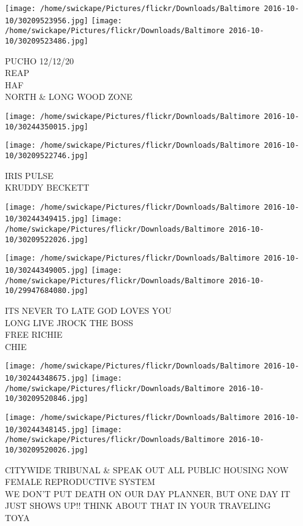 \documentclass[10pt,letterpaper]{article}
\begin{document}
\texttt{[image: /home/swickape/Pictures/flickr/Downloads/Baltimore 2016-10-10/30209523956.jpg]}
\texttt{[image: /home/swickape/Pictures/flickr/Downloads/Baltimore 2016-10-10/30209523486.jpg]}

PUCHO 12/12/20\\
REAP\\
HAF\\
NORTH \& LONG WOOD ZONE
\pagebreak

\texttt{[image: /home/swickape/Pictures/flickr/Downloads/Baltimore 2016-10-10/30244350015.jpg]}

\vspace{0.25in}
\texttt{[image: /home/swickape/Pictures/flickr/Downloads/Baltimore 2016-10-10/30209522746.jpg]}

IRIS PULSE\\
KRUDDY BECKETT
\pagebreak

\texttt{[image: /home/swickape/Pictures/flickr/Downloads/Baltimore 2016-10-10/30244349415.jpg]}
\texttt{[image: /home/swickape/Pictures/flickr/Downloads/Baltimore 2016-10-10/30209522026.jpg]}

\texttt{[image: /home/swickape/Pictures/flickr/Downloads/Baltimore 2016-10-10/30244349005.jpg]}
\texttt{[image: /home/swickape/Pictures/flickr/Downloads/Baltimore 2016-10-10/29947684080.jpg]}

ITS NEVER TO LATE GOD LOVES YOU\\
LONG LIVE JROCK THE BOSS\\
FREE RICHIE\\
CHIE
\pagebreak

\texttt{[image: /home/swickape/Pictures/flickr/Downloads/Baltimore 2016-10-10/30244348675.jpg]}
\texttt{[image: /home/swickape/Pictures/flickr/Downloads/Baltimore 2016-10-10/30209520846.jpg]}

\texttt{[image: /home/swickape/Pictures/flickr/Downloads/Baltimore 2016-10-10/30244348145.jpg]}
\texttt{[image: /home/swickape/Pictures/flickr/Downloads/Baltimore 2016-10-10/30209520026.jpg]}

CITYWIDE TRIBUNAL \& SPEAK OUT ALL PUBLIC HOUSING NOW\\
FEMALE REPRODUCTIVE SYSTEM\\
WE DON'T PUT DEATH ON OUR DAY PLANNER, BUT ONE DAY IT JUST SHOWS UP!! THINK ABOUT THAT IN YOUR TRAVELING\\
TOYA
\pagebreak
\end{document}
